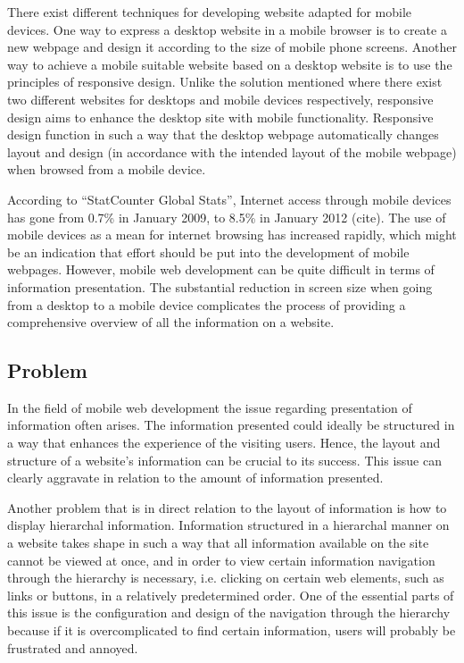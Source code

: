 There exist different techniques for developing website adapted for mobile devices. One way to express a desktop website in a mobile browser is to create a new webpage and design it according to the size of mobile phone screens. Another way to achieve a mobile suitable website based on a desktop website is to use the principles of responsive design. Unlike the solution mentioned where there exist two different websites for desktops and mobile devices respectively, responsive design aims to enhance the desktop site with mobile functionality. Responsive design function in such a way that the desktop webpage automatically changes layout and design (in accordance with the intended layout of the mobile webpage) when browsed from a mobile device.

According to “StatCounter Global Stats”, Internet access through mobile devices has gone from 0.7\% in January 2009, to 8.5\% in January 2012 (cite). The use of mobile devices as a mean for internet browsing has increased rapidly, which might be an indication that effort should be put into the development of mobile webpages. However, mobile web development can be quite difficult in terms of information presentation. The substantial reduction in screen size when going from a desktop to a mobile device complicates the process of providing a comprehensive overview of all the information on a website.




\subsection{Problem}
In the field of mobile web development the issue regarding presentation of information often arises. The information presented could ideally be structured in a way that enhances the experience of the visiting users. Hence, the layout and structure of a website’s information can be crucial to its success. This issue can clearly aggravate in relation to the amount of information presented. 

Another problem that is in direct relation to the layout of information is how to display hierarchal information. Information structured in a hierarchal manner on a website takes shape in such a way that all information available on the site cannot be viewed at once, and in order to view certain information navigation through the hierarchy is necessary, i.e. clicking on certain web elements, such as links or buttons, in a relatively predetermined order. One of the essential parts of this issue is the configuration and design of the navigation through the hierarchy because if it is overcomplicated to find certain information, users will probably be frustrated and annoyed. 

